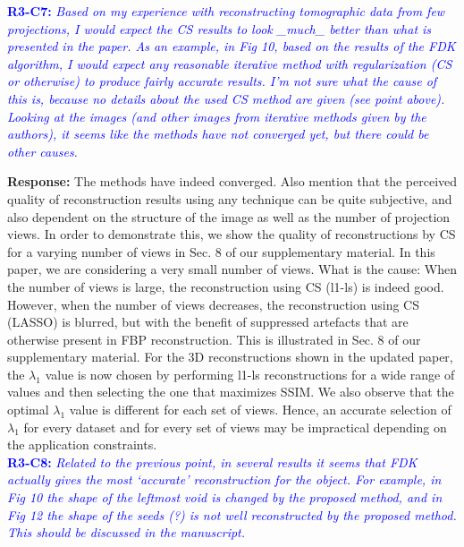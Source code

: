 \documentclass{article}
\begin{document}
\textcolor{blue}{\textbf{R3-C7:}\textit{ Based on my experience with reconstructing tomographic data from few projections, I would expect the CS results to look \_much\_ better than what is presented in the paper. As an example, in Fig 10, based on the results of the FDK algorithm, I would expect any reasonable iterative method with regularization (CS or otherwise) to produce fairly accurate results. I'm not sure what the cause of this is, because no details about the used CS method are given (see point above). Looking at the images (and other images from iterative methods given by the authors), it seems like the methods have not converged yet, but there could be other causes.}}

\textbf{Response:} The methods have indeed converged. Also mention that the perceived quality of reconstruction results using any technique can be quite subjective, and also dependent on the structure of the image as well as the number of projection views. In order to demonstrate this, we show the quality of reconstructions by CS for a varying number of views in Sec. 8 of our supplementary material. In this paper, we are considering a very small number of views.  
What is the cause: When the number of views is large, the reconstruction using CS (l1-ls) is indeed good. However, when the number of views decreases, the reconstruction using CS (LASSO) is blurred, but with the benefit of suppressed artefacts that are otherwise present in FBP reconstruction. This is illustrated in Sec. 8 of our supplementary material.      
For the 3D reconstructions shown in the updated paper, the $\lambda_1$ value is now chosen by performing l1-ls reconstructions for a wide range of values and then selecting the one that maximizes SSIM.
We also observe that the optimal $\lambda_1$ value is different for each set of views. Hence, an accurate selection of $\lambda_1$ for every dataset and for every set of views may be impractical depending on the application constraints.\\

\textcolor{blue}{\textbf{R3-C8:}\textit{ Related to the previous point, in several results it seems that FDK actually gives the most `accurate' reconstruction for the object. For example, in Fig 10 the shape of the leftmost void is changed by the proposed method, and in Fig 12 the shape of the seeds (?) is not well reconstructed by the proposed method. This should be discussed in the manuscript.}}
    
\end{document}

